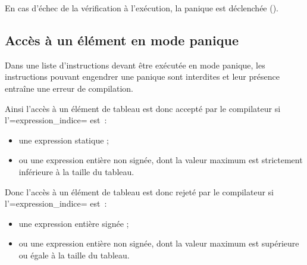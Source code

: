 
En cas d'échec de la vérification à l'exécution, la panique est déclenchée ().

\subsection{Accès à un élément en mode panique}

Dans une liste d'instructions devant être exécutée en mode panique, les instructions pouvant engendrer une panique sont interdites et leur présence entraîne une erreur de compilation.

Ainsi l'accès à un élément de tableau est donc accepté par le compilateur si l'\plm=expression_indice= est~:
\begin{itemize}
\item une expression statique ;
\item ou une expression entière non signée, dont la valeur maximum est strictement inférieure à la taille du tableau.
\end{itemize}


Donc l'accès à un élément de tableau est donc rejeté par le compilateur si l'\plm=expression_indice= est~:
\begin{itemize}
\item une expression entière signée ;
\item ou une expression entière non signée, dont la valeur maximum est supérieure ou égale à la taille du tableau.
\end{itemize}


